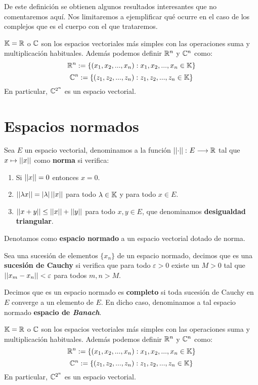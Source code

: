 De este definición se obtienen algunos resultados interesantes que no comentaremos aquí. Nos limitaremos a ejemplificar qué ocurre en el caso de los complejos que es el cuerpo con el que trataremos.

\begin{example} $\mathbb{K}=\mathbb{R}$ o $\mathbb{C}$ son los espacios vectoriales más simples con las operaciones suma y multiplicación habituales. Además podemos definir $\mathbb{R}^n$ y $\mathbb{C}^n$ como:
\[\mathbb{R}^n:=\{(x_1,x_2,...,x_n): x_1,x_2,...,x_n\in\mathbb{K}\}\]
\[\mathbb{C}^n:=\{(z_1,z_2,...,z_n): z_1,z_2,...,z_n\in\mathbb{K}\}\]
En particular, $\mathbb{C}^{2^n}$ es un espacio vectorial.
\end{example}

\section{Espacios normados}

\begin{definition} Sea $E$ un espacio vectorial, denominamos a la función $\left|\left|\cdot\right|\right|\colon E\longrightarrow \mathbb{R}$ tal que $x\mapsto\left|\left|x\right|\right|$ como \textbf{norma} si verifica:
\begin{enumerate}[label=\alph*)]
\item Si $\left|\left|x\right|\right|=0$ entonces $x=0$.
\item $\left|\left|\lambda x\right|\right|=|\lambda|\left|\left|x\right|\right|$ para todo $\lambda\in\mathbb{K}$ y para todo $x\in E$.
\item $\left|\left|x+y\right|\right|\leq \left|\left|x\right|\right| + \left|\left|y\right|\right|$ para todo $x,y\in E$, que denominamos \textbf{desigualdad triangular}.
\end{enumerate}

Denotamos como \textbf{espacio normado} a un espacio vectorial dotado de norma.
\end{definition}

\begin{definition} Sea una sucesión de elementos $\{x_n\}$ de un espacio normado, decimos que es una \textbf{sucesión de Cauchy} si verifica que para todo $\varepsilon>0$ existe un $M>0$ tal que $\left|\left|x_m-x_n\right|\right|<\varepsilon$ para todos $m,n>M$.
\end{definition}

\begin{definition} Decimos que es un espacio normado es \textbf{completo} si toda sucesión de Cauchy en $E$ converge a un elemento de $E$. En dicho caso, denominamos a tal espacio normado \textbf{espacio de \textit{Banach}}.
\end{definition}

\begin{example} $\mathbb{K}=\mathbb{R}$ o $\mathbb{C}$ son los espacios vectoriales más simples con las operaciones suma y multiplicación habituales. Además podemos definir $\mathbb{R}^n$ y $\mathbb{C}^n$ como:
\[\mathbb{R}^n:=\{(x_1,x_2,...,x_n): x_1,x_2,...,x_n\in\mathbb{K}\}\]
\[\mathbb{C}^n:=\{(z_1,z_2,...,z_n): z_1,z_2,...,z_n\in\mathbb{K}\}\]
En particular, $\mathbb{C}^{2^n}$ es un espacio vectorial.
\end{example}

